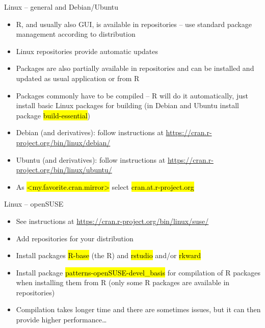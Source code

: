 \documentclass[compress, ucs, xelatex, 11pt, xcolor=svgnames,
  hyperref={
    bookmarks=true,
    unicode=true,
    colorlinks=true,
    pdftitle={Molecular data in R},
    plainpages=false,
    pdfauthor={Vojtech Zeisek},
    pdfsubject={Course about phylogeny and evolution in R},
    pdfcreator={XeLaTeX},
    pdfkeywords={R, evolution, phylogeny, molecular data},
    linkcolor=Tomato,
    anchorcolor=SaddleBrown,
    citecolor=Goldenrod,
    filecolor=DarkMagenta,
    menucolor=Sienna,
    urlcolor=DarkTurquoise,
    pdftex},
  url={hyphens, lowtilde} %
  ]{beamer}
\renewcommand{\texttt}[1]{\hl{\ttfamily #1}}
\begin{document}
\begin{frame}{Linux -- general and Debian/Ubuntu}
\begin{itemize}
 \item R, and usually also GUI, is available in repositories -- use standard package management according to distribution
 \item Linux repositories provide automatic updates
 \item Packages are also partially available in repositories and can be installed and updated as usual application or from R
 \item Packages commonly have to be compiled -- R will do it automatically, just install basic Linux packages for building (in Debian and Ubuntu install package \texttt{build-essential})
 \item Debian (and derivatives): follow instructions at \url{https://cran.r-project.org/bin/linux/debian/}
 \item Ubuntu (and derivatives): follow instructions at \url{https://cran.r-project.org/bin/linux/ubuntu/}
 \item As \texttt{<my.favorite.cran.mirror>} select \alert{\texttt{cran.at.r-project.org}}
\end{itemize}
\end{frame}

\begin{frame}{Linux -- openSUSE}
\begin{itemize}
 \item See instructions at \url{https://cran.r-project.org/bin/linux/suse/}
 \item Add repositories for your distribution
 \begin{itemize}
 \end{itemize}
 \item Install packages \texttt{R-base} (the R) and \texttt{rstudio} and/or \texttt{rkward}
 \item Install package \texttt{patterns-openSUSE-devel\_basis} for compilation of R packages when installing them from R (only some R packages are available in repositories)
 \item Compilation takes longer time and there are sometimes issues, but it can then provide higher performance\ldots
\end{itemize}
\end{frame}
\end{document}
